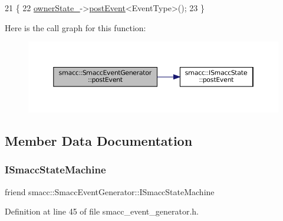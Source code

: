 \begin{DoxyCode}
21     \{
22         \hyperlink{classsmacc_1_1SmaccEventGenerator_ac7efdd1d9c69906c3a9d3f66e13bb04a}{ownerState\_}->\hyperlink{classsmacc_1_1ISmaccState_acef404ab3766ddf2892e8dad14a4a7cf}{postEvent}<EventType>();
23     \}
\end{DoxyCode}
Here is the call graph for this function\+:
\nopagebreak
\begin{figure}[H]
\begin{center}
\leavevmode
\includegraphics[width=350pt]{classsmacc_1_1SmaccEventGenerator_a9c1df7c3e6b5ff7bf0da8f6d24fab4bb_cgraph}
\end{center}
\end{figure}


\subsection{Member Data Documentation}
\mbox{\label{classsmacc_1_1SmaccEventGenerator_acf9f0c148c1ca8b39fd21aaf52d4ea39}} 
\subsubsection{\texorpdfstring{I\+Smacc\+State\+Machine}{ISmaccStateMachine}}
{\footnotesize\ttfamily friend smacc\+::\+Smacc\+Event\+Generator\+::\+I\+Smacc\+State\+Machine\hspace{0.3cm}{\ttfamily [private]}}



Definition at line 45 of file smacc\+\_\+event\+\_\+generator.\+h.

\mbox{\label{classsmacc_1_1SmaccEventGenerator_ac7efdd1d9c69906c3a9d3f66e13bb04a}} 
